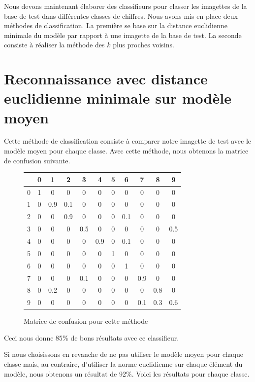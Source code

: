 Nous devons maintenant élaborer des classifieurs pour classer
les imagettes de la base de test dans différentes classes de chiffres.
Nous avons mis en place deux méthodes de classification. La première se 
base sur la distance euclidienne minimale du modèle par rapport à une
imagette de la base de test. La seconde consiste à réaliser la méthode des
$ k $ plus proches voisins.

\section{Reconnaissance avec distance euclidienne
minimale sur modèle moyen}

Cette méthode de classification consiste à comparer notre imagette de
test avec le modèle moyen pour chaque classe.
Avec cette méthode, nous obtenons la matrice de confusion suivante.

\begin{figure}[!h]
\centering
\begin{tabular}{|*{11}{c|}}
    \hline
     & 0 & 1 & 2 & 3 & 4 & 5 & 6 & 7 & 8 & 9 \\
    \hline
    0 & 1 & 0  & 0  & 0  & 0  & 0 & 0 & 0 & 0 & 0 \\
    \hline
    1 & 0 & 0.9 & 0.1 & 0  & 0 & 0 & 0 & 0 & 0 & 0 \\
    \hline
    2 & 0 & 0 & 0.9 & 0 & 0 & 0 & 0.1 & 0 & 0 & 0 \\
    \hline
    3 & 0 & 0 & 0 & 0.5 & 0 & 0 & 0 & 0 & 0 & 0.5 \\
    \hline
    4 & 0 & 0 & 0 & 0 & 0.9 & 0 & 0.1 & 0 & 0 & 0 \\
    \hline
    5 & 0 & 0 & 0 & 0 & 0 & 1 & 0 & 0 & 0 & 0 \\
    \hline
    6 & 0 & 0 & 0 & 0 & 0 & 0 & 1 & 0 & 0 & 0 \\
    \hline
    7 & 0 & 0 & 0 & 0.1 & 0 & 0 & 0 & 0.9 & 0 & 0 \\
    \hline
    8 & 0 & 0.2 & 0 & 0 & 0 & 0 & 0 & 0 & 0.8 & 0 \\
    \hline
    9 & 0 & 0 & 0 & 0 & 0 & 0 & 0 & 0.1 & 0.3 & 0.6 \\
    \hline
\end{tabular}
\caption{Matrice de confusion pour cette méthode}
\end{figure} 

Ceci nous donne 85\% de bons résultats avec ce classifieur.

Si nous choisissons en revanche de ne pas utiliser le modèle moyen
pour chaque classe mais, au contraire, d'utiliser la norme euclidienne
sur chaque élément du modèle, nous obtenons un résultat de 92\%. Voici 
les résultats pour chaque classe.


